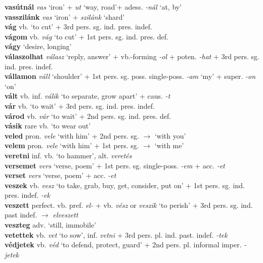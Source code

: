 \documentclass[11pt]{article}
\begin{document}
\textbf{vasútnál} \emph{vas} `iron' + \emph{ut} `way, road'+
adess. \emph{-nál} `at, by' \\
\textbf{vasszilánk} \emph{vas} `iron' + \emph{szilánk} `shard' \\
\textbf{vág} vb. `to cut' + 3rd pers. sg. ind. pres. indef. \\
\textbf{vágom} vb. \emph{vág} `to cut' + 1st pers. sg. ind. pres. def. \\
\textbf{vágy} `desire, longing' \\
\textbf{válaszolhat} \emph{válasz} `reply, answer' +
vb.-forming \emph{-ol} + poten. \emph{-hat} + 3rd
pers. sg. ind. pres. indef. \\
\textbf{vállamon} \emph{váll} `shoulder' + 1st
pers. sg. poss. single\hyp{}poss. \emph{-am} `my' + super. \emph{-on} `on' \\
\textbf{vált} vb. inf. \emph{válik} `to separate, grow apart' +
caus. \emph{-t} \\
\textbf{vár} vb. `to wait' + 3rd pers. sg. ind. pres. indef. \\
\textbf{várod} vb. \emph{vár} `to wait' + 2nd
pers. sg. ind. pres. def. \\
\textbf{vásik} rare vb. `to wear out' \\
\textbf{veled} pron. \emph{vele} `with him' + 2nd
pers. sg. $\rightarrow$ `with you' \\
\textbf{velem} pron. \emph{vele} `with him' + 1st
pers. sg. $\rightarrow$ `with me' \\
\textbf{veretni} inf. vb. `to hammer', alt. \emph{veretés} \\
\textbf{versemet} \emph{vers} `verse, poem' + 1st pers. sg. single\hyp{}poss. \emph{-em} + acc. \emph{-et} \\
\textbf{verset} \emph{vers} `verse, poem' + acc. \emph{-et} \\
\textbf{veszek} vb. \emph{vesz} `to take, grab, buy, get, consider, put on'
  + 1st pers. sg. ind. pres. indef. \emph{-ek} \\
\textbf{veszett} perfect. vb. pref. \emph{el-} + vb. \emph{vész}
or \emph{veszik} `to perish' + 3rd pers. sg. ind. past indef. $\rightarrow$ \emph{elveszett} \\
\textbf{veszteg} adv. `still, immobile' \\
\textbf{vetettek} vb. \emph{vet} `to sow', inf. \emph{vetni} + 3rd
pers. pl. ind. past. indef. \emph{-tek} \\
\textbf{védjetek} vb. \emph{véd} `to defend, protect, guard' + 2nd pers. pl. informal imper. \emph{-jetek} \\
\end{document}
